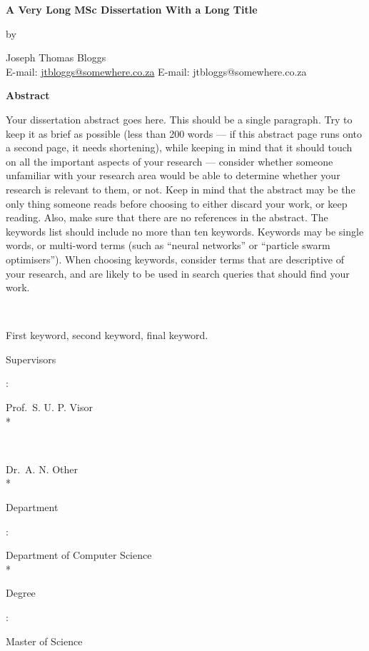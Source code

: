 
\newpage

\begin{center}
	{\large\bf A Very Long MSc Dissertation With a Long Title}
\end{center}
\begin{center}by\end{center}
\begin{center}
	{Joseph Thomas Bloggs}\\
	\ifpdf
		E-mail: \href{mailto:jtbloggs@somewhere.co.za}{jtbloggs@somewhere.co.za}
	\else
		E-mail: jtbloggs@somewhere.co.za
	\fi
\end{center}
\vspace{1cm}
\begin{center}{\large\bf Abstract}\end{center}
Your dissertation abstract goes here. This should be a single paragraph. Try to keep it as brief as possible (less than 200 words --- if this abstract page runs onto a second page, it needs shortening), while keeping in mind that it should touch on all the important aspects of your research --- consider whether someone unfamiliar with your research area would be able to determine whether your research is relevant to them, or not. Keep in mind that the abstract may be the only thing someone reads before choosing to either discard your work, or keep reading. Also, make sure that there are no references in the abstract. The keywords list should include no more than ten keywords. Keywords may be single words, or multi-word terms (such as ``neural networks'' or ``particle swarm optimisers''). When choosing keywords, consider terms that are descriptive of your research, and are likely to be used in search queries that should find your work.

\noindent\

 First keyword, second keyword, final keyword.

\vfill
\noindent
{\bf\parbox{26.8mm}{Supervisors}:} Prof.~S. U. P. Visor \\* %
{\bf\parbox{28.55mm}{~}} Dr.~A. N. Other \\*
{\bf\parbox{26.8mm}{Department}:} Department of Computer Science \\*
{\bf\parbox{26.8mm}{Degree}:} Master of Science

